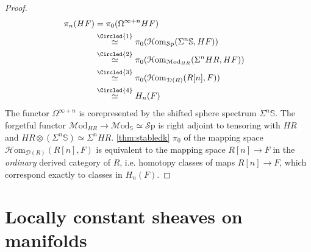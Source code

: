 \documentclass[a4paper]{book}
\newcommand{\lD}{\mathcal{D}}
\newcommand{\lH}{\mathcal{H}}
\newcommand{\lM}{\mathcal{M}}
\newcommand{\lS}{\mathcal{S}}
\newcommand{\bS}{\mathbb{S}}
\newcommand{\Sp}{\lS\mathrm{p}} %
\newcommand{\Hom}{\lH\mathrm{om}} %
\newcommand{\Mod}{\lM\mathrm{od}} %
\theoremstyle{definition}
\theoremstyle{remark}
\numberwithin{equation}{section}
\begin{document}
\begin{proof}
  \begin{align*}
    \pi_n(HF) & =\pi_0(\Omega^{\infty+n}HF)\\
    & \overset{\Circled{1}}{\simeq} \pi_0(\Hom_{\Sp}(\Sigma^n\bS,HF)) \\
    & \overset{\Circled{2}}{\simeq} \pi_0(\Hom_{\Mod_{HR}}(\Sigma^n HR,HF)) & \\
    & \overset{\Circled{3}}{\simeq} \pi_0(\Hom_{\lD(R)}(R[n],F))\\
    & \overset{\Circled{4}}{\simeq} H_n(F)
  \end{align*}  The functor $\Omega^{\infty+n}$ is corepresented by the shifted sphere spectrum $\Sigma^n\bS$.  The forgetful functor $\Mod_{HR}\to\Mod_\bS\simeq\Sp$ is right adjoint to tensoring with $HR$ and $HR\otimes(\Sigma^n\bS)\simeq \Sigma^nHR$.  \cref{thm:stabledk}  $\pi_0$ of the mapping space $\Hom_{\lD(R)}(R[n],F)$ is equivalent to the mapping space $R[n]\to F$ in the \emph{ordinary} derived category of $R$, i.e. homotopy classes of maps $R[n]\to F$, which correspond exactly to classes in $H_n(F)$.
\end{proof}

\section{Locally constant sheaves on manifolds}\label{sec:constant sheaves}
\end{document}
